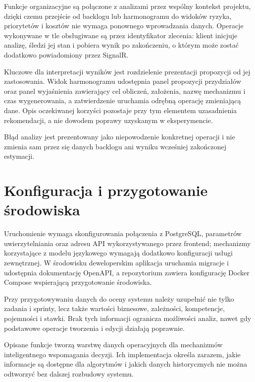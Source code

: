 Funkcje organizacyjne są połączone z analizami przez wspólny kontekst projektu, dzięki czemu przejście od backlogu lub harmonogramu do widoków ryzyka, priorytetów i kosztów nie wymaga ponownego wprowadzania danych. Operacje wykonywane w tle obsługiwane są przez identyfikator zlecenia: klient inicjuje analizę, śledzi jej stan i pobiera wynik po zakończeniu, o którym może zostać dodatkowo powiadomiony przez SignalR.

Kluczowe dla interpretacji wyników jest rozdzielenie prezentacji propozycji od jej zastosowania. Widok harmonogramu udostępnia panel propozycji przydziałów oraz panel wyjaśnienia zawierający cel obliczeń, założenia, nazwę mechanizmu i czas wygenerowania, a zatwierdzenie uruchamia odrębną operację zmieniającą dane. Opis oczekiwanej korzyści pozostaje przy tym elementem uzasadnienia rekomendacji, a nie dowodem poprawy uzyskanym w eksperymencie.

Błąd analizy jest prezentowany jako niepowodzenie konkretnej operacji i nie zmienia sam przez się danych backlogu ani wyniku wcześniej zakończonej estymacji.

\section{Konfiguracja i przygotowanie środowiska}

Uruchomienie wymaga skonfigurowania połączenia z PostgreSQL, parametrów uwierzytelniania oraz adresu API wykorzystywanego przez frontend; mechanizmy korzystające z modelu językowego wymagają dodatkowo konfiguracji usługi zewnętrznej. W środowisku deweloperskim aplikacja uruchamia migracje i udostępnia dokumentację OpenAPI, a repozytorium zawiera konfigurację Docker Compose wspierającą przygotowanie środowiska.

Przy przygotowywaniu danych do oceny systemu należy uzupełnić nie tylko zadania i sprinty, lecz także wartości biznesowe, zależności, kompetencje, pojemności i stawki. Brak tych informacji ogranicza możliwości analiz, nawet gdy podstawowe operacje tworzenia i edycji działają poprawnie.

Opisane funkcje tworzą warstwę danych operacyjnych dla mechanizmów inteligentnego wspomagania decyzji. Ich implementacja określa zarazem, jakie informacje są dostępne dla algorytmów i jakich danych historycznych nie można odtworzyć bez dalszej rozbudowy systemu.